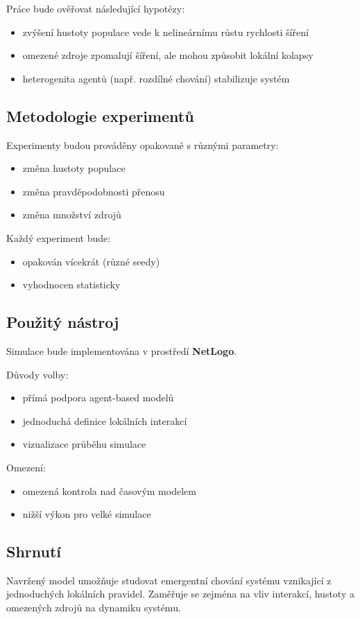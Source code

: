 Práce bude ověřovat následující hypotézy:

\begin{itemize}
\item zvýšení hustoty populace vede k nelineárnímu růstu rychlosti šíření
\item omezené zdroje zpomalují šíření, ale mohou způsobit lokální kolapsy
\item heterogenita agentů (např. rozdílné chování) stabilizuje systém
\end{itemize}

\subsection{Metodologie experimentů}

Experimenty budou prováděny opakovaně s různými parametry:

\begin{itemize}
\item změna hustoty populace
\item změna pravděpodobnosti přenosu
\item změna množství zdrojů
\end{itemize}

Každý experiment bude:
\begin{itemize}
\item opakován vícekrát (různé seedy)
\item vyhodnocen statisticky
\end{itemize}

\subsection{Použitý nástroj}

Simulace bude implementována v prostředí \textbf{NetLogo}.

Důvody volby:
\begin{itemize}
\item přímá podpora agent-based modelů
\item jednoduchá definice lokálních interakcí
\item vizualizace průběhu simulace
\end{itemize}

Omezení:
\begin{itemize}
\item omezená kontrola nad časovým modelem
\item nižší výkon pro velké simulace
\end{itemize}

\subsection{Shrnutí}

Navržený model umožňuje studovat emergentní chování systému vznikající z jednoduchých lokálních pravidel. Zaměřuje se zejména na vliv interakcí, hustoty a omezených zdrojů na dynamiku systému.

